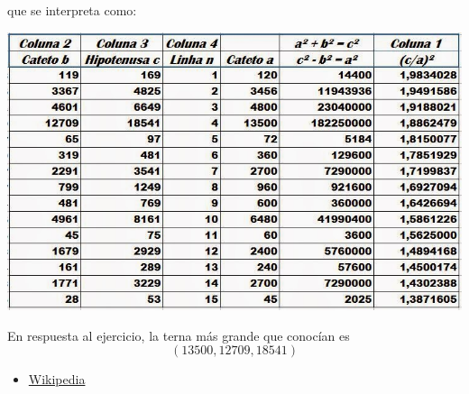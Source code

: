 \begin{problem}[3]
que se interpreta como:
\begin{center}
\includegraphics[width=0.8\linewidth]{img/plimton322.jpg}
\end{center}

En respuesta al ejercicio, la terna más grande que conocían es
\[(13500, 12709, 18541)\]

\begin{itemize}
\item \href{https://es.wikipedia.org/wiki/Plimpton_322}{Wikipedia}
\end{itemize}

\end{problem}

